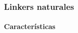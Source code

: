 % 
% 
% 
% 
% 
% 
% 
% 
% 
% 






















\subsubsection{Linkers naturales}


\paragraph{Características} \hspace{0pt} \\


